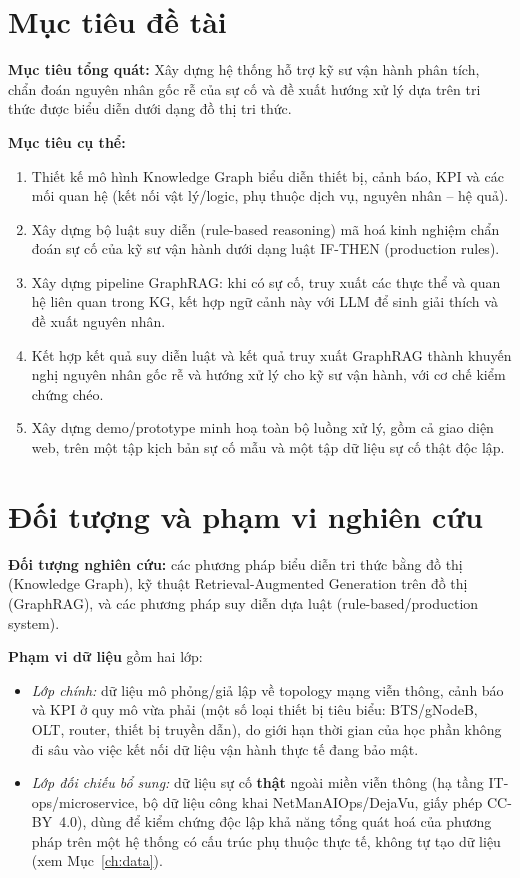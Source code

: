 \documentclass[12pt,a4paper]{report}
\begin{document}
\section{Mục tiêu đề tài}

\textbf{Mục tiêu tổng quát:} Xây dựng hệ thống hỗ trợ kỹ sư vận hành phân tích, chẩn đoán nguyên
nhân gốc rễ của sự cố và đề xuất hướng xử lý dựa trên tri thức được biểu diễn dưới dạng đồ thị tri
thức.

\textbf{Mục tiêu cụ thể:}
\begin{enumerate}[label=(\arabic*)]
    \item Thiết kế mô hình Knowledge Graph biểu diễn thiết bị, cảnh báo, KPI và các mối quan hệ
    (kết nối vật lý/logic, phụ thuộc dịch vụ, nguyên nhân -- hệ quả).
    \item Xây dựng bộ luật suy diễn (rule-based reasoning) mã hoá kinh nghiệm chẩn đoán sự cố của
    kỹ sư vận hành dưới dạng luật IF-THEN (production rules).
    \item Xây dựng pipeline GraphRAG: khi có sự cố, truy xuất các thực thể và quan hệ liên quan
    trong KG, kết hợp ngữ cảnh này với LLM để sinh giải thích và đề xuất nguyên nhân.
    \item Kết hợp kết quả suy diễn luật và kết quả truy xuất GraphRAG thành khuyến nghị nguyên
    nhân gốc rễ và hướng xử lý cho kỹ sư vận hành, với cơ chế kiểm chứng chéo.
    \item Xây dựng demo/prototype minh hoạ toàn bộ luồng xử lý, gồm cả giao diện web, trên một tập
    kịch bản sự cố mẫu và một tập dữ liệu sự cố thật độc lập.
\end{enumerate}

\section{Đối tượng và phạm vi nghiên cứu}

\textbf{Đối tượng nghiên cứu:} các phương pháp biểu diễn tri thức bằng đồ thị (Knowledge Graph),
kỹ thuật Retrieval-Augmented Generation trên đồ thị (GraphRAG), và các phương pháp suy diễn dựa
luật (rule-based/production system).

\textbf{Phạm vi dữ liệu} gồm hai lớp:
\begin{itemize}
    \item \emph{Lớp chính:} dữ liệu mô phỏng/giả lập về topology mạng viễn thông, cảnh báo và KPI
    ở quy mô vừa phải (một số loại thiết bị tiêu biểu: BTS/gNodeB, OLT, router, thiết bị truyền
    dẫn), do giới hạn thời gian của học phần không đi sâu vào việc kết nối dữ liệu vận hành thực
    tế đang bảo mật.
    \item \emph{Lớp đối chiếu bổ sung:} dữ liệu sự cố \textbf{thật} ngoài miền viễn thông (hạ tầng
    IT-ops/microservice, bộ dữ liệu công khai NetManAIOps/DejaVu, giấy phép CC-BY~4.0), dùng để
    kiểm chứng độc lập khả năng tổng quát hoá của phương pháp trên một hệ thống có cấu trúc phụ
    thuộc thực tế, không tự tạo dữ liệu (xem Mục~\ref{ch:data}).
\end{itemize}
\end{document}
